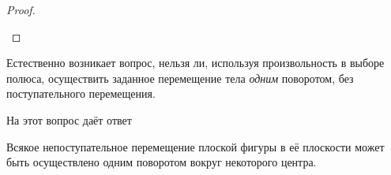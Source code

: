 \begin{proof}
  \begin{figure}[H]
    \centering

    \caption{}
    \label{fig:15_2}
  \end{figure}
\end{proof}

Естественно возникает вопрос, нельзя ли, используя произвольность в выборе
полюса, осуществить заданное перемещение тела \textit{одним} поворотом, без
поступательного перемещения.

На этот вопрос даёт ответ
\begin{theorem}[Эйлера]
  \label{theorem:euler}
  Всякое непоступательное перемещение плоской фигуры в её плоскости может быть
  осуществлено одним поворотом вокруг некоторого центра.
\end{theorem}


